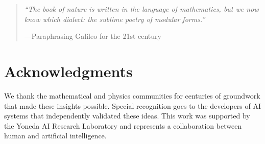 \documentclass[12pt,a4paper]{article}
\begin{document}
\begin{quote}
\textit{``The book of nature is written in the language of mathematics, but we now know which dialect: the sublime poetry of modular forms.''} 

---Paraphrasing Galileo for the 21st century
\end{quote}

\section*{Acknowledgments}

We thank the mathematical and physics communities for centuries of groundwork that made these insights possible. Special recognition goes to the developers of AI systems that independently validated these ideas. This work was supported by the Yoneda AI Research Laboratory and represents a collaboration between human and artificial intelligence.
\end{document}
